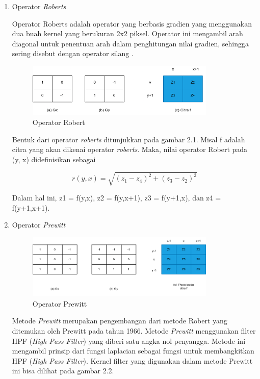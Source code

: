 \begin{enumerate}[leftmargin=1cm, itemindent=0.6cm,labelwidth=15pt, labelsep=5pt, listparindent=1cm,align=left]

    \item Operator \textit{Roberts}

    Operator Roberts adalah operator yang berbasis gradien yang menggunakan dua buah kernel yang berukuran 2x2 piksel. Operator ini mengambil arah diagonal untuk penentuan arah dalam penghitungan nilai gradien, sehingga sering disebut dengan operator silang \textcite{mulyanto2009teori}.

\begin{figure}[ht]
    \includegraphics[width=0.85\textwidth, center]{images/Robert.png}
    \caption{Operator Robert}
\end{figure}

    Bentuk dari operator \textit{roberts} ditunjukkan pada gambar 2.1. Misal f adalah citra yang akan dikenai operator \textit{roberts}. Maka, nilai operator Robert pada (y, x) didefinisikan sebagai

\begin{equation}
r(y,x) = \sqrt{(z_1 - z_4)^2 + (z_3 - z_2)^2}
\end{equation}

Dalam hal ini, z1 = f(y,x), z2 = f(y,x+1), z3 = f(y+1,x), dan z4 = f(y+1,x+1).

\item Operator \textit{Prewitt}

\begin{figure}[ht]
    \includegraphics[width=0.85\textwidth, center]{images/Prewitt.png}
    \caption{Operator Prewitt}
\end{figure}

    Metode \textit{Prewitt} merupakan pengembangan dari metode Robert yang ditemukan oleh Prewitt pada tahun 1966. Metode \textit{Prewitt} menggunakan filter HPF (\textit{High Pass Filter}) yang diberi satu angka nol penyangga. Metode ini mengambil prinsip dari fungsi laplacian sebagai fungsi untuk membangkitkan HPF (\textit{High Pass Filter}). Kernel filter yang digunakan dalam metode Prewitt ini bisa dilihat pada gambar 2.2.


\end{enumerate}
